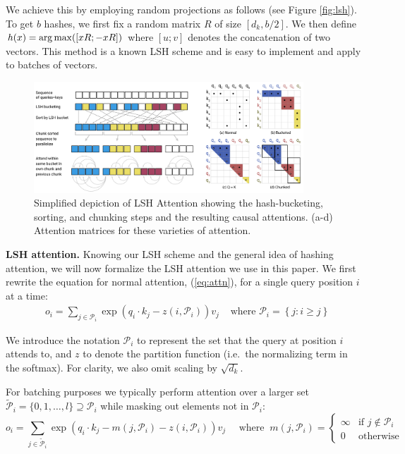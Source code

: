 \documentclass{article} %
\renewcommand{\paragraph}[1]{\textbf{#1}}
\def\pair{\mathcal{P}}
\def\extpair{\widetilde{\mathcal{P}}}
\begin{document}
We achieve this by employing random projections as follows (see Figure \ref{fig:lsh}).
To get $b$ hashes, we first fix a random matrix $R$ of size $[d_k, b/2]$.
We then define $h(x) = \operatorname*{arg\,max}([xR; -xR])$ where $[u; v]$ denotes the concatenation of two vectors.
This method is a known LSH scheme \citep{andoni2015angularLSH} and is easy to implement
and apply to batches of vectors.

\begin{figure}
        \centering
        \includegraphics[width=0.9\textwidth]{figures/combined-attention-figs.png}
        \caption{Simplified depiction of LSH Attention showing the hash-bucketing, sorting, 
                  and chunking steps and the resulting causal attentions. (a-d) Attention matrices for these varieties of attention.}
        \label{fig:attnpattern}
\end{figure}

\paragraph{LSH attention.}
Knowing our LSH scheme and the general idea of hashing attention, we will now formalize the LSH attention we use in this paper. We first rewrite the equation for normal attention, (\ref{eq:attn}), for a single query position $i$ at a time:
%
\begin{align}
    &o_i = \sum_{j \in \pair_i} \exp \left(q_i \cdot k_j - z(i, \pair_i) \right) v_j
    &\text{ where } \pair_i = \left\{j : i \geq j \right\}
\end{align}

We introduce the notation $\pair_i$ to represent the set that the query at position $i$ attends to, and $z$ to denote the partition function (i.e.\ the normalizing term in the softmax). For clarity, we also omit scaling by $\sqrt{d_k}$.

For batching purposes we typically perform attention over a larger set $\extpair_i = \{0, 1, \ldots, l\} \supseteq \pair_i$ while masking out elements not in $\pair_i$:
\begin{equation}\label{eq:attn-masked}
    o_i = \sum_{j \in \extpair_i} \exp \left(q_i \cdot k_j - m(j, \pair_i) - z(i, \pair_i) \right) v_j \quad
    \text{ where } \ m(j, \pair_i) = \begin{cases}
    \infty & \text{if } j \notin \pair_i\\
    0 & \text{otherwise}
    \end{cases}
\end{equation}
\end{document}
